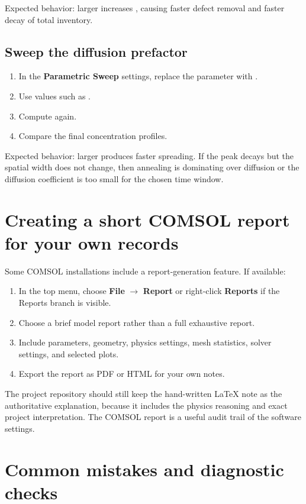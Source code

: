 \documentclass[11pt]{article}
\newcommand{\code}[1]{\texttt{\detokenize{#1}}}
\begin{document}
Expected behavior: larger \code{k0} increases \code{kann}, causing faster defect removal and faster decay of total inventory.

\subsection{Sweep the diffusion prefactor}

\begin{enumerate}[leftmargin=2em]
\item In the \textbf{Parametric Sweep} settings, replace the parameter with \code{D0}.
\item Use values such as \code{1e-10[m^2/s] 1e-9[m^2/s] 1e-8[m^2/s]}.
\item Compute again.
\item Compare the final concentration profiles.
\end{enumerate}

Expected behavior: larger \code{D0} produces faster spreading. If the peak decays but the spatial width does not change, then annealing is dominating over diffusion or the diffusion coefficient is too small for the chosen time window.

\section{Creating a short COMSOL report for your own records}

Some COMSOL installations include a report-generation feature. If available:
\begin{enumerate}[leftmargin=2em]
\item In the top menu, choose \textbf{File} $\rightarrow$ \textbf{Report} or right-click \textbf{Reports} if the Reports branch is visible.
\item Choose a brief model report rather than a full exhaustive report.
\item Include parameters, geometry, physics settings, mesh statistics, solver settings, and selected plots.
\item Export the report as PDF or HTML for your own notes.
\end{enumerate}

The project repository should still keep the hand-written LaTeX note as the authoritative explanation, because it includes the physics reasoning and exact project interpretation. The COMSOL report is a useful audit trail of the software settings.

\section{Common mistakes and diagnostic checks}
\end{document}
